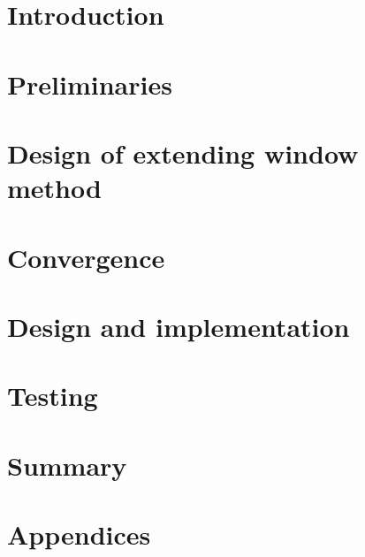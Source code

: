 \documentclass[a4paper, 11pt]{report}
\theoremstyle{definition}
\begin{document}


\chapter*{Introduction}


\chapter{Preliminaries}
\label{chap:preliminaries}


\chapter{Design of extending window method}
\label{chap:methodDescription}




\chapter{Convergence}
\label{chap:convergence}



\chapter{Design and implementation}
\label{chap:implementation}


\chapter{Testing}
\label{chap:testing}



\chapter*{Summary}







\appendix
\chapter*{Appendices}
\renewcommand{\thesection}{\Alph{section}}
% 


\end{document}
